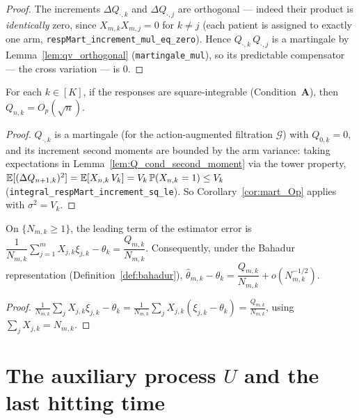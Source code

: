\begin{proof}\leanok
{}
The increments $\Delta Q_{\cdot,k}$ and $\Delta Q_{\cdot,j}$ are orthogonal --- indeed their
product is \emph{identically} zero, since $X_{m,k}X_{m,j} = 0$ for $k \ne j$ (each patient is
assigned to exactly one arm, \texttt{respMart\_increment\_mul\_eq\_zero}). Hence
$Q_{\cdot,k}\,Q_{\cdot,j}$ is a martingale by Lemma~\ref{lem:qv_orthogonal}
(\texttt{martingale\_mul}), so its predictable compensator --- the cross variation --- is $0$.
\end{proof}

\begin{lemma}\label{lem:Q_Op}
\leanok
{}
For each $k \in [K]$, if the responses are square-integrable (Condition~\textbf{A}), then
$Q_{n,k} = O_p(\sqrt n)$.
\end{lemma}

\begin{proof}\leanok
{}
$Q_{\cdot,k}$ is a martingale (for the action-augmented filtration $\mathcal{G}$) with
$Q_{0,k}=0$, and its increment second moments are bounded by the arm variance: taking
expectations in Lemma~\ref{lem:Q_cond_second_moment} via the tower property,
$\mathbb{E}[(\Delta Q_{n+1,k})^2] = \mathbb{E}[X_{n,k}\,V_k] = V_k\,\mathbb{P}(X_{n,k}=1) \le V_k$
(\texttt{integral\_respMart\_increment\_sq\_le}). So Corollary~\ref{cor:mart_Op} applies with
$\sigma^2 = V_k$.
\end{proof}

\begin{lemma}\label{lem:theta_error_Q}
\leanok
{}
On $\{N_{m,k}\ge1\}$, the leading term of the estimator error is
$\dfrac{1}{N_{m,k}}\sum_{j=1}^m X_{j,k}\xi_{j,k} - \theta_k
 = \dfrac{Q_{m,k}}{N_{m,k}}$.
Consequently, under the Bahadur representation
(Definition~\ref{def:bahadur}),
$\hat{\theta}_{m,k} - \theta_k = \dfrac{Q_{m,k}}{N_{m,k}} + o(N_{m,k}^{-1/2})$.
\end{lemma}

\begin{proof}
$\frac{1}{N_{m,k}}\sum_j X_{j,k}\xi_{j,k} - \theta_k
= \frac{1}{N_{m,k}}\sum_j X_{j,k}(\xi_{j,k}-\theta_k)
= \frac{Q_{m,k}}{N_{m,k}}$, using $\sum_j X_{j,k} = N_{m,k}$.
\leanok
\end{proof}

\section{The auxiliary process \texorpdfstring{$U$}{U} and the last hitting time}
\label{sec:aux_U}

